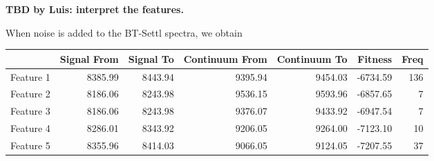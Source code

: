 {\bf TBD by Luis: interpret the features.}

When noise is added to the BT-Settl spectra, we obtain 


\begin{table}
\begin{center}
\begin{tabular}{rrrrrrr}
  \hline
 & Signal From & Signal To & Continuum From & Continuum To & Fitness & Freq \\ 
  \hline
Feature 1 & 8385.99 & 8443.94 & 9395.94 & 9454.03 & -6734.59 & 136 \\ 
Feature 2 & 8186.06 & 8243.98 & 9536.15 & 9593.96 & -6857.65 &   7 \\ 
Feature 3 & 8186.06 & 8243.98 & 9376.07 & 9433.92 & -6947.54 &   7 \\ 
Feature 4 & 8286.01 & 8343.92 & 9206.05 & 9264.00 & -7123.10 &  10 \\ 
Feature 5 & 8355.96 & 8414.03 & 9066.05 & 9124.05 & -7207.55 &  37 \\ 

\end{tabular}
\end{center}
\end{table}
